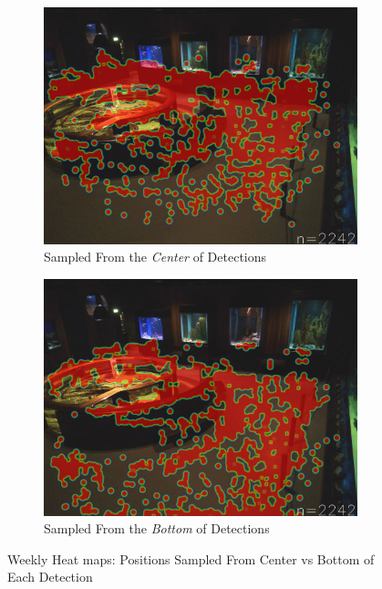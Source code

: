 \begin{figure}[H]
    \centering
    \begin{subfigure}{0.475\textwidth}
        \centering
        \includegraphics[width=\textwidth]{Images/Analytics/heatmap_center.jpg}
        \caption{Sampled From the \textit{Center} of Detections}
    \end{subfigure}
    \hfill
    \begin{subfigure}{0.475\textwidth}
        \centering
        \includegraphics[width=1\textwidth]{Images/Analytics/heatmap_bottom_center.jpg}
        \caption{Sampled From the \textit{Bottom} of Detections}
    \end{subfigure}
    \caption{Weekly Heat maps: Positions Sampled From Center vs Bottom of Each Detection}
    \label{fig:heat_map_final}
\end{figure}

